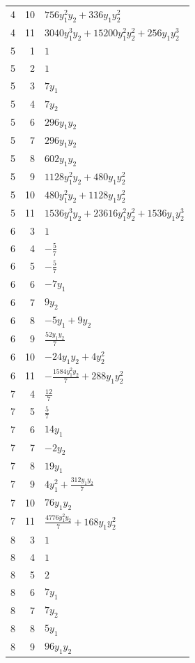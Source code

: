 \documentclass[10pt,a4paper]{article}
\begin{document}
{\begin{longtable}{rrp{125mm}}
4 & 10 & $756 y_{1}^{2} y_{2} + 336 y_{1} y_{2}^{2}$\\
4 & 11 & $3040 y_{1}^{3} y_{2} + 15200 y_{1}^{2} y_{2}^{2} + 256 y_{1} y_{2}^{3}$\\
5 & 1 & $1$\\
5 & 2 & $1$\\
5 & 3 & $7 y_{1}$\\
5 & 4 & $7 y_{2}$\\
5 & 6 & $296 y_{1} y_{2}$\\
5 & 7 & $296 y_{1} y_{2}$\\
5 & 8 & $602 y_{1} y_{2}$\\
5 & 9 & $1128 y_{1}^{2} y_{2} + 480 y_{1} y_{2}^{2}$\\
5 & 10 & $480 y_{1}^{2} y_{2} + 1128 y_{1} y_{2}^{2}$\\
5 & 11 & $1536 y_{1}^{3} y_{2} + 23616 y_{1}^{2} y_{2}^{2} + 1536 y_{1} y_{2}^{3}$\\
6 & 3 & $1$\\
6 & 4 & $- \frac{5}{7}$\\
6 & 5 & $- \frac{5}{7}$\\
6 & 6 & $- 7 y_{1}$\\
6 & 7 & $9 y_{2}$\\
6 & 8 & $- 5 y_{1} + 9 y_{2}$\\
6 & 9 & $\frac{52 y_{1} y_{2}}{7}$\\
6 & 10 & $- 24 y_{1} y_{2} + 4 y_{2}^{2}$\\
6 & 11 & $- \frac{1584 y_{1}^{2} y_{2}}{7} + 288 y_{1} y_{2}^{2}$\\
7 & 4 & $\frac{12}{7}$\\
7 & 5 & $\frac{5}{7}$\\
7 & 6 & $14 y_{1}$\\
7 & 7 & $- 2 y_{2}$\\
7 & 8 & $19 y_{1}$\\
7 & 9 & $4 y_{1}^{2} + \frac{312 y_{1} y_{2}}{7}$\\
7 & 10 & $76 y_{1} y_{2}$\\
7 & 11 & $\frac{4776 y_{1}^{2} y_{2}}{7} + 168 y_{1} y_{2}^{2}$\\
8 & 3 & $1$\\
8 & 4 & $1$\\
8 & 5 & $2$\\
8 & 6 & $7 y_{1}$\\
8 & 7 & $7 y_{2}$\\
8 & 8 & $5 y_{1}$\\
8 & 9 & $96 y_{1} y_{2}$\\

\end{longtable}}
\end{document}
